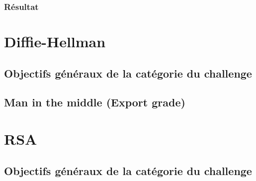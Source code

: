\documentclass[12pt, a4paper]{article}
\begin{document}
        \subsubsection{Résultat}

\section{Diffie-Hellman}
    \subsection{Objectifs généraux de la catégorie du challenge}
    
    \subsection{Man in the middle (Export grade)}

\section{RSA}
    \subsection{Objectifs généraux de la catégorie du challenge}

\end{document}
